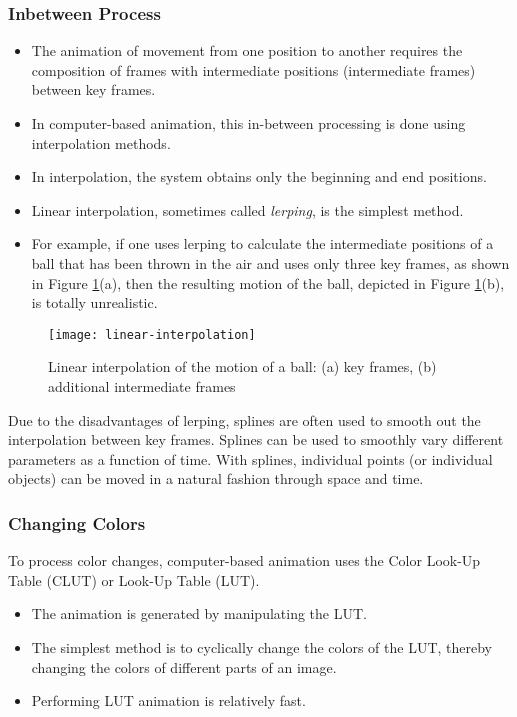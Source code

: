 \subsubsection{Inbetween Process}
\begin{itemize}
	\item The animation of movement from one position to another requires the composition of frames with intermediate positions (intermediate frames) between key frames.
	\item In computer-based animation, this in-between processing is done using interpolation methods. 
	\item In interpolation, the system obtains only the beginning and end positions. 
	\item Linear interpolation, sometimes called \textit{lerping}, is the simplest method.
	\item For example, if one uses lerping to calculate the intermediate positions of a ball that has been thrown in the air and uses only three key frames, as
	shown in Figure {\ref{fig:linear-interpolation}}(a), then the resulting motion of the ball, depicted in Figure {\ref{fig:linear-interpolation}}(b),
	is totally unrealistic.
\end{itemize}


\begin{figure}[H]
	\centering
	\texttt{[image: linear-interpolation]}
	\caption[Linear interpolation of the motion of a ball]{Linear interpolation of the motion of a ball: (a) key frames, (b) additional intermediate frames}{\label{fig:linear-interpolation}}
\end{figure}

Due to the disadvantages of lerping, splines are often used to smooth out the interpolation between key frames. Splines can be used to smoothly vary different parameters as a function of time. With splines, individual points (or individual objects) can be moved in a natural fashion through space and time. 


\subsubsection{Changing Colors}
To process color changes, computer-based animation uses the Color Look-Up	Table (CLUT) or Look-Up Table (LUT). 
\begin{itemize}
	\item The animation is generated by manipulating the LUT.
	\item The simplest method is to cyclically change the colors of the LUT, thereby changing the colors of different parts of an image. 
	\item Performing LUT animation is relatively fast.
\end{itemize}

